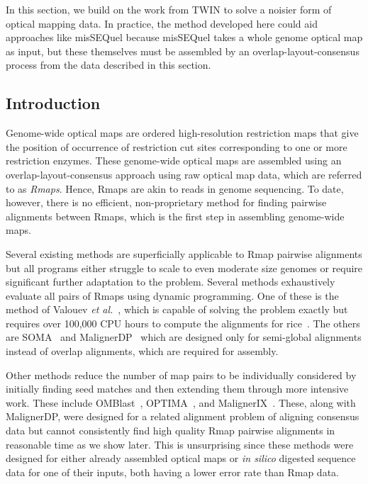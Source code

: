 In this section, we build on the work from TWIN to solve a noisier form of optical mapping data.  In practice, the method developed here could aid approaches like misSEQuel because \mbox{misSEQuel} takes a whole genome optical map as input, but these themselves must be assembled by an overlap-layout-consensus process from the data described in this section.


\subsection{Introduction}




Genome-wide optical maps are ordered high-resolution restriction maps that give the position of occurrence of  restriction cut sites corresponding to one or more restriction enzymes.  These genome-wide optical maps are assembled using an overlap-layout-consensus approach using  raw optical map data, which are referred to as {\em Rmaps}.  Hence, Rmaps are akin to reads in genome sequencing.  To date, however, there is no efficient, non-proprietary method for finding pairwise alignments between Rmaps, which is the first step in assembling genome-wide maps.

Several existing methods are superficially applicable to Rmap pairwise alignments but all programs either struggle to scale to even moderate size genomes or require significant further adaptation to the problem. Several methods exhaustively evaluate all pairs of Rmaps using dynamic programming.  One of these is the method of Valouev {\it et al.}~\cite{Valouev06}, which is capable of solving the problem exactly but requires over 100,000 CPU hours to compute the alignments for rice~\cite{valouev2006algorithm}.  The others are SOMA~\cite{Nagarajan08} and MalignerDP~\cite{maligner} which are designed only for semi-global alignments instead of overlap alignments, which are required for assembly.

Other methods reduce the number of map pairs to be individually considered by initially finding seed matches and then extending them through more intensive work.  These include OMBlast~\cite{omblast}, OPTIMA~\cite{optima}, and MalignerIX~\cite{maligner}.  These, along with MalignerDP, were designed for a related alignment problem of aligning consensus data but cannot consistently find high quality Rmap pairwise alignments in reasonable time as we show later.  This is unsurprising since these methods were designed for either already assembled optical maps or \emph{in silico} digested sequence data for one of their inputs, both having a lower error rate than Rmap data.

